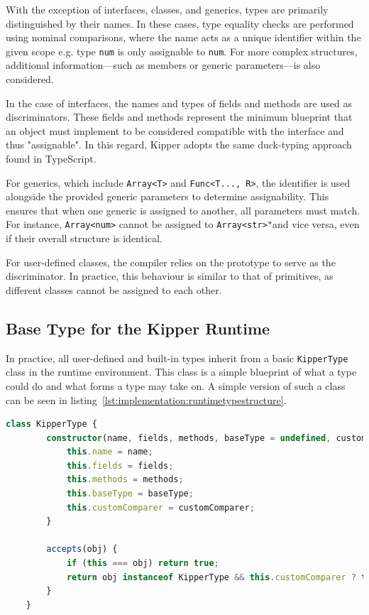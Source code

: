 With the exception of interfaces, classes, and generics, types are primarily distinguished by their names. In these cases, type equality checks are performed using nominal comparisons, where the name acts as a unique identifier within the given scope e.g. type \lstinline|num| is only assignable to \lstinline|num|. For more complex structures, additional information—such as members or generic parameters—is also considered.

In the case of interfaces, the names and types of fields and methods are used as discriminators. These fields and methods represent the minimum blueprint that an object must implement to be considered compatible with the interface and thus "assignable". In this regard, Kipper adopts the same duck-typing approach found in TypeScript.

For generics, which include \lstinline|Array<T>| and \lstinline|Func<T..., R>|, the identifier is used alongside the provided generic parameters to determine assignability. This ensures that when one generic is assigned to another, all parameters must match. For instance, \lstinline|Array<num>| cannot be assigned to \lstinline|Array<str>"|and vice versa, even if their overall structure is identical.

For user-defined classes, the compiler relies on the prototype to serve as the discriminator. In practice, this behaviour is similar to that of primitives, as different classes cannot be assigned to each other.

\subsection{Base Type for the Kipper Runtime}
\label{subsec:basetype}

In practice, all user-defined and built-in types inherit from a basic \lstinline|KipperType| class in the runtime environment. This class is a simple blueprint of what a type could do and what forms a type may take on. A simple version of such a class can be seen in listing~\ref{lst:implementation:runtimetypestructure}.

\begin{lstlisting}[language=TypeScript,caption=The structure of a runtime type,label=lst:implementation:runtimetypestructure]
	class KipperType {
		constructor(name, fields, methods, baseType = undefined, customComparer = undefined) {
			this.name = name;
			this.fields = fields;
			this.methods = methods;
			this.baseType = baseType;
			this.customComparer = customComparer;
		}

		accepts(obj) {
			if (this === obj) return true;
			return obj instanceof KipperType && this.customComparer ? this.customComparer(this, obj) : false;
		}
	}
\end{lstlisting}

